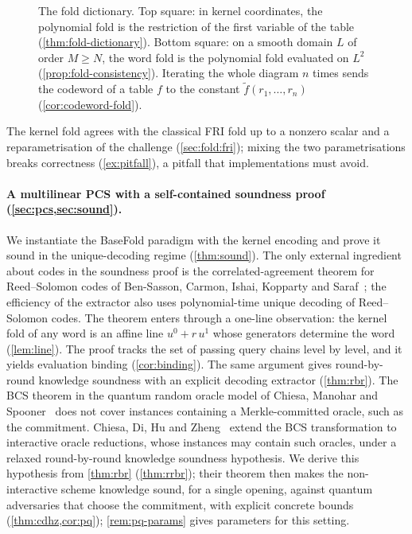 \begin{figure}[t]
\centering
{}
\caption{The fold dictionary. Top square: in kernel coordinates, the polynomial fold is the restriction of the first variable of the table (\cref{thm:fold-dictionary}). Bottom square: on a smooth domain $L$ of order $M \ge N$, the word fold is the polynomial fold evaluated on $L^2$ (\cref{prop:fold-consistency}). Iterating the whole diagram $n$ times sends the codeword of a table $f$ to the constant $\tilde f(r_1,\dots,r_n)$ (\cref{cor:codeword-fold}).}
\label{fig:dictionary}
\end{figure}
The kernel fold agrees with the classical FRI fold up to a nonzero scalar and a reparametrisation of the challenge (\cref{sec:fold:fri}); mixing the two parametrisations breaks correctness (\cref{ex:pitfall}), a pitfall that implementations must avoid.

\paragraph{A multilinear PCS with a self-contained soundness proof (\cref{sec:pcs,sec:sound}).}
We instantiate the BaseFold paradigm with the kernel encoding and prove it sound in the unique-decoding regime (\cref{thm:sound}).
The only external ingredient about codes in the soundness proof is the correlated-agreement theorem for Reed--Solomon codes of Ben-Sasson, Carmon, Ishai, Kopparty and Saraf~\cite{BCIKS23}; the efficiency of the extractor also uses polynomial-time unique decoding of Reed--Solomon codes.
The theorem enters through a one-line observation: the kernel fold of any word is an affine line $u^0 + r\,u^1$ whose generators determine the word (\cref{lem:line}).
The proof tracks the set of passing query chains level by level, and it yields evaluation binding (\cref{cor:binding}).
The same argument gives round-by-round knowledge soundness with an explicit decoding extractor (\cref{thm:rbr}).
The BCS theorem in the quantum random oracle model of Chiesa, Manohar and Spooner~\cite{CMS19} does not cover instances containing a Merkle-committed oracle, such as the commitment. Chiesa, Di, Hu and Zheng~\cite{CDHZ25} extend the BCS transformation to interactive oracle reductions, whose instances may contain such oracles, under a relaxed round-by-round knowledge soundness hypothesis. We derive this hypothesis from \cref{thm:rbr} (\cref{thm:rrbr}); their theorem then makes the non-interactive scheme knowledge sound, for a single opening, against quantum adversaries that choose the commitment, with explicit concrete bounds (\cref{thm:cdhz,cor:pq}); \cref{rem:pq-params} gives parameters for this setting.

